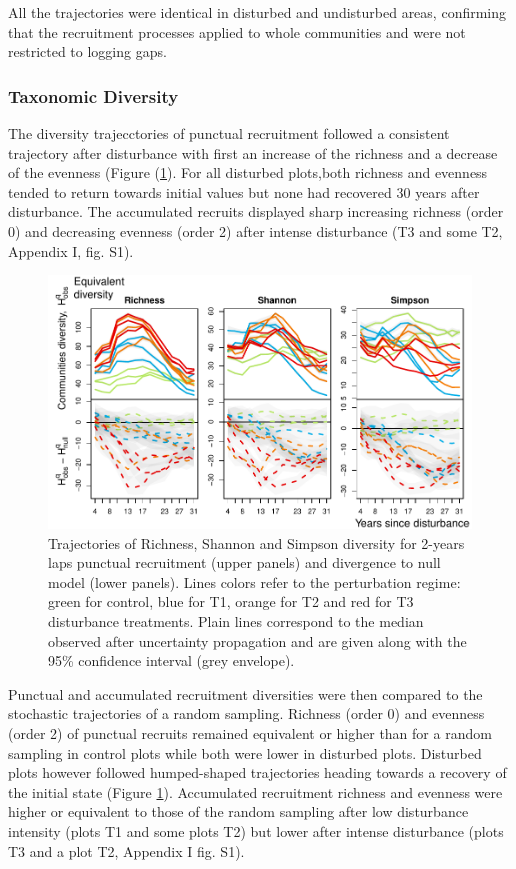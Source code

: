 \documentclass[fleqn,10pt]{ArtEcoFoG} %
\begin{document}
All the trajectories were identical in disturbed and undisturbed areas,
confirming that the recruitment processes applied to whole communities
and were not restricted to logging gaps.

\subsubsection{Taxonomic Diversity}\label{taxonomic-diversity}

The diversity trajecctories of punctual recruitment followed a
consistent trajectory after disturbance with first an increase of the
richness and a decrease of the evenness (Figure (\ref{fig:DivTraj}). For
all disturbed plots,both richness and evenness tended to return towards
initial values but none had recovered 30 years after disturbance. The
accumulated recruits displayed sharp increasing richness (order 0) and
decreasing evenness (order 2) after intense disturbance (T3 and some T2,
Appendix I, fig. S1).

\begin{figure}

{\centering \includegraphics[width=0.8\linewidth]{RecruitmentTrajectories_files/figure-latex/DivTraj-1} 

}

\caption{Trajectories of Richness, Shannon and Simpson diversity for 2-years laps punctual  recruitment (upper panels) and divergence to null model (lower panels). Lines colors refer to the perturbation regime: green for control, blue for T1, orange for T2 and red for T3 disturbance treatments. Plain lines correspond to the median observed after uncertainty propagation and are given along with the 95\% confidence interval (grey envelope).}\label{fig:DivTraj}
\end{figure}

Punctual and accumulated recruitment diversities were then compared to
the stochastic trajectories of a random sampling. Richness (order 0) and
evenness (order 2) of punctual recruits remained equivalent or higher
than for a random sampling in control plots while both were lower in
disturbed plots. Disturbed plots however followed humped-shaped
trajectories heading towards a recovery of the initial state (Figure
\ref{fig:DivTraj}). Accumulated recruitment richness and evenness were
higher or equivalent to those of the random sampling after low
disturbance intensity (plots T1 and some plots T2) but lower after
intense disturbance (plots T3 and a plot T2, Appendix I fig. S1).
\end{document}
